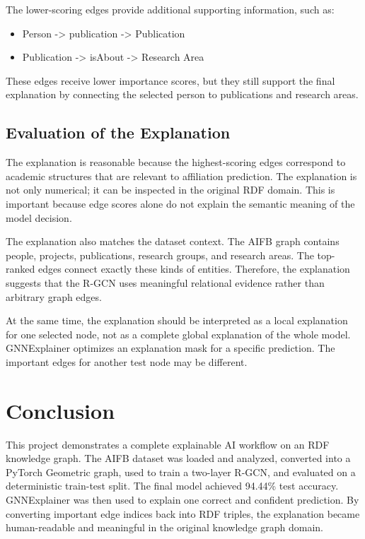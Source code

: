 \documentclass[runningheads]{llncs}
\begin{document}
The lower-scoring edges provide additional supporting information, such as:

\begin{itemize}
    \item Person -> publication -> Publication
    \item Publication -> isAbout -> Research Area
\end{itemize}

These edges receive lower importance scores, but they still support the final explanation by connecting the selected person to publications and research areas.

\subsection{Evaluation of the Explanation}

The explanation is reasonable because the highest-scoring edges correspond to academic structures that are relevant to affiliation prediction. The explanation is not only numerical; it can be inspected in the original RDF domain. This is important because edge scores alone do not explain the semantic meaning of the model decision.

The explanation also matches the dataset context. The AIFB graph contains people, projects, publications, research groups, and research areas. The top-ranked edges connect exactly these kinds of entities. Therefore, the explanation suggests that the R-GCN uses meaningful relational evidence rather than arbitrary graph edges.

At the same time, the explanation should be interpreted as a local explanation for one selected node, not as a complete global explanation of the whole model. GNNExplainer optimizes an explanation mask for a specific prediction. The important edges for another test node may be different.

\section{Conclusion}

This project demonstrates a complete explainable AI workflow on an RDF knowledge graph. The AIFB dataset was loaded and analyzed, converted into a PyTorch Geometric graph, used to train a two-layer R-GCN, and evaluated on a deterministic train-test split. The final model achieved 94.44\% test accuracy. GNNExplainer was then used to explain one correct and confident prediction. By converting important edge indices back into RDF triples, the explanation became human-readable and meaningful in the original knowledge graph domain.
\end{document}
